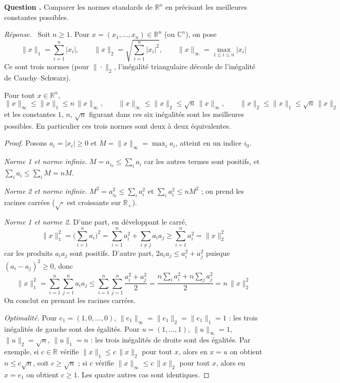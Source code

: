 \documentclass[11pt]{article}
\newcounter{qnum}
\newcommand{\question}[1]{%
\stepcounter{qnum}%
\bigskip
\noindent\textbf{Question \theqnum.} #1\par}
\newcommand{\reponse}{\noindent\textit{Réponse.}\ }
\begin{document}
\question{Comparer les normes standards de $\mathbb{R}^n$ en précisant les meilleures constantes possibles.}
\reponse
Soit $n\geq 1$. Pour $x=(x_1,\dots,x_n)\in\mathbb{R}^n$ (ou $\mathbb{C}^n$), on pose
\[\|x\|_1=\sum_{i=1}^n|x_i|,\qquad\|x\|_2=\sqrt{\sum_{i=1}^n|x_i|^2},\qquad\|x\|_\infty=\max_{1\leq i\leq n}|x_i|\]
Ce sont trois normes (pour $\|\cdot\|_2$, l'inégalité triangulaire découle de l'inégalité de Cauchy--Schwarz).

\begin{prop}
\label{prop:comparaison-normes-rn}
Pour tout $x\in\mathbb{R}^n$,
\[\|x\|_\infty\leq\|x\|_1\leq n\,\|x\|_\infty,\qquad\|x\|_\infty\leq\|x\|_2\leq\sqrt n\,\|x\|_\infty,\qquad\|x\|_2\leq\|x\|_1\leq\sqrt n\,\|x\|_2\]
et les constantes $1$, $n$, $\sqrt n$ figurant dans ces six inégalités sont les meilleures possibles. En particulier ces trois normes sont deux à deux équivalentes.
\end{prop}

\begin{proof}
Posons $a_i=|x_i|\geq 0$ et $M=\|x\|_\infty=\max_ia_i$, atteint en un indice $i_0$.

\emph{Norme 1 et norme infinie.} $M=a_{i_0}\leq\sum_ia_i$ car les autres termes sont positifs, et $\sum_ia_i\leq\sum_iM=nM$.

\emph{Norme 2 et norme infinie.} $M^2=a_{i_0}^2\leq\sum_ia_i^2$ et $\sum_ia_i^2\leq nM^2$ ; on prend les racines carrées ($\sqrt{\cdot}$ est croissante sur $\mathbb{R}_+$).

\emph{Norme 1 et norme 2.} D'une part, en développant le carré,
\[\|x\|_1^2=\Big(\sum_{i=1}^na_i\Big)^2=\sum_{i=1}^na_i^2+\sum_{i\neq j}a_ia_j\geq\sum_{i=1}^na_i^2=\|x\|_2^2\]
car les produits $a_ia_j$ sont positifs. D'autre part, $2a_ia_j\leq a_i^2+a_j^2$ puisque $(a_i-a_j)^2\geq 0$, donc
\[\|x\|_1^2=\sum_{i=1}^n\sum_{j=1}^na_ia_j\leq\sum_{i=1}^n\sum_{j=1}^n\frac{a_i^2+a_j^2}{2}=\frac{n\sum_ia_i^2+n\sum_ja_j^2}{2}=n\,\|x\|_2^2\]
On conclut en prenant les racines carrées.

\emph{Optimalité.} Pour $e_1=(1,0,\dots,0)$, $\|e_1\|_\infty=\|e_1\|_2=\|e_1\|_1=1$ : les trois inégalités de gauche sont des égalités. Pour $u=(1,\dots,1)$, $\|u\|_\infty=1$, $\|u\|_2=\sqrt n$, $\|u\|_1=n$ : les trois inégalités de droite sont des égalités. Par exemple, si $c\in\mathbb{R}$ vérifie $\|x\|_1\leq c\,\|x\|_2$ pour tout $x$, alors en $x=u$ on obtient $n\leq c\sqrt n$, soit $c\geq\sqrt n$ ; si $c$ vérifie $\|x\|_\infty\leq c\,\|x\|_2$ pour tout $x$, alors en $x=e_1$ on obtient $c\geq 1$. Les quatre autres cas sont identiques.
\end{proof}
\end{document}
